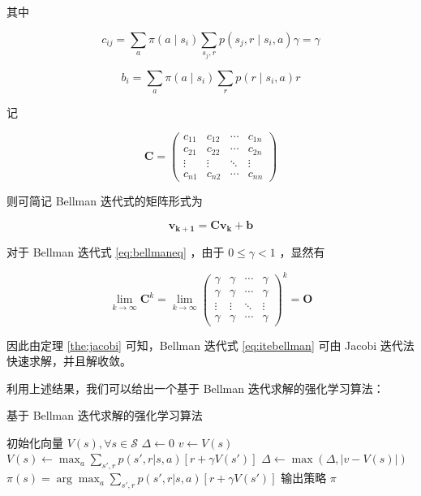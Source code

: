 其中

\begin{equation}
    c_{ij} =\sum_a\pi(a\mid s_i)\sum_{s_j,r}p(s_j,r \mid s_i,a)\gamma =\gamma
\end{equation}

\begin{equation}
    b_{i} =\sum_a\pi(a\mid s_i)\sum_{r}p(r\mid s_i,a)r
\end{equation}

记

\begin{equation}
    \boldsymbol{C} =
    \left(\begin{array}{cccc}
    c_{11} & c_{12} & \cdots & c_{1n} \\
    c_{21} & c_{22} & \cdots & c_{2n} \\
    \vdots & \vdots & \ddots & \vdots \\
    c_{n1} & c_{n2} & \cdots & c_{nn}
    \end{array}\right)
\end{equation}

则可简记 Bellman 迭代式的矩阵形式为

\begin{equation}\label{eq:bellmaneq}
    \boldsymbol{v_{k+1}} =\boldsymbol{Cv_k}+\boldsymbol{b}
\end{equation}

对于 Bellman 迭代式 \ref{eq:bellmaneq} ，由于 $0\leq\gamma<1$ ，显然有

\begin{equation}
    \lim_{k\rightarrow \infty} \boldsymbol{C}^k = \lim_{k\rightarrow \infty}\left(\begin{array}{cccc}
    \gamma & \gamma & \cdots & \gamma \\
    \gamma & \gamma & \cdots & \gamma \\
    \vdots & \vdots & \ddots & \vdots \\
    \gamma & \gamma & \cdots & \gamma
    \end{array}\right)^k = \boldsymbol{O}
\end{equation}

因此由定理 \ref{the:jacobi} 可知，Bellman 迭代式 \ref{eq:itebellman} 可由 Jacobi 迭代法快速求解，并且解收敛。

利用上述结果，我们可以给出一个基于 Bellman 迭代求解的强化学习算法：

\begin{algorithm}[H]
    \caption{基于 Bellman 迭代求解的强化学习算法}
    \begin{algorithmic}[1] %
        \State 初始化向量 $V(s), \forall s\in \mathcal S$
        \Repeat
        \State $\Delta\leftarrow 0$
        \State $v\leftarrow V(s)$
        \State $V(s)\leftarrow \max_a\sum_{s',r}p(s',r|s,a)[r+\gamma V(s')]$
        \State $\Delta \leftarrow \max(\Delta,|v-V(s)|)$
        \EndFor
        \Until{ $\Delta<\theta$}
        \State
        \State $\pi(s)=\arg\max_a\sum_{s',r}p(s',r|s,a)[r+\gamma V(s')]$
        \State 输出策略 $\pi$
    \end{algorithmic}
\end{algorithm}